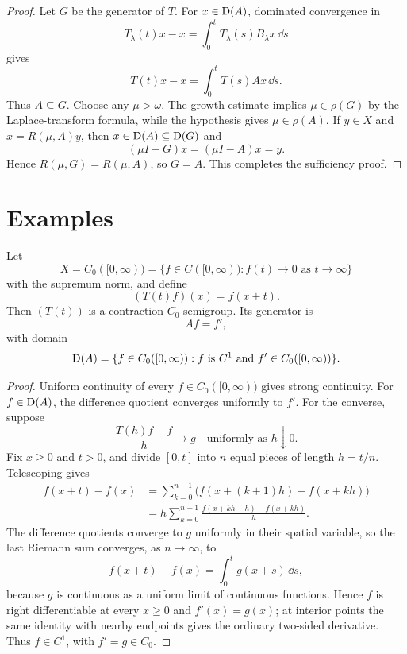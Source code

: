\begin{proof}
Let $G$ be the generator of $T$.  For $x\in\operatorname{D}(A)$, dominated convergence in
\[
  T_\lambda(t)x-x=\int_0^tT_\lambda(s)B_\lambda x\,\dd s
\]
gives
\[
  T(t)x-x=\int_0^tT(s)Ax\,\dd s.
\]
Thus $A\subseteq G$.  Choose any $\mu>\omega$.  The growth estimate implies
$\mu\in\rho(G)$ by the Laplace-transform formula, while the hypothesis gives
$\mu\in\rho(A)$.  If $y\in X$ and $x=R(\mu,A)y$, then
$x\in\operatorname{D}(A)\subseteq\operatorname{D}(G)$ and
\[
  (\mu I-G)x=(\mu I-A)x=y.
\]
Hence $R(\mu,G)=R(\mu,A)$, so $G=A$.  This completes the sufficiency proof.
\end{proof}

\section{Examples}

\begin{notetheorem}
Let
\[
  X=C_0([0,\infty))
  =\{f\in C([0,\infty)):f(t)\to0\text{ as }t\to\infty\}
\]
with the supremum norm, and define
\[
  (T(t)f)(x)=f(x+t).
\]
Then $(T(t))$ is a contraction $C_0$-semigroup.  Its generator is
\[
  Af=f',
\]
with domain
\[
  \operatorname{D}(A)=\{f\in C_0([0,\infty)):
               f\text{ is }C^1\text{ and }f'\in C_0([0,\infty))\}.
\]
\end{notetheorem}

\begin{proof}
Uniform continuity of every $f\in C_0([0,\infty))$ gives strong continuity.
For $f\in\operatorname{D}(A)$, the difference quotient converges uniformly to $f'$.  For
the converse, suppose
\[
  \frac{T(h)f-f}{h}\longrightarrow g
  \quad\text{uniformly as }h\downarrow0.
\]
Fix $x\ge0$ and $t>0$, and divide $[0,t]$ into $n$ equal pieces of length
$h=t/n$.  Telescoping gives
\[
\begin{aligned}
  f(x+t)-f(x)
  &=\sum_{k=0}^{n-1}\bigl(f(x+(k+1)h)-f(x+kh)\bigr)\\
  &=h\sum_{k=0}^{n-1}
      \frac{f(x+kh+h)-f(x+kh)}{h}.
\end{aligned}
\]
The difference quotients converge to $g$ uniformly in their spatial variable,
so the last Riemann sum converges, as $n\to\infty$, to
\[
  f(x+t)-f(x)=\int_0^t g(x+s)\,\dd s,
\]
because $g$ is continuous as a uniform limit of continuous functions.  Hence
$f$ is right differentiable at every $x\ge0$ and $f'(x)=g(x)$; at interior
points the same identity with nearby endpoints gives the ordinary two-sided
derivative.  Thus $f\in C^1$, with $f'=g\in C_0$.
\end{proof}

